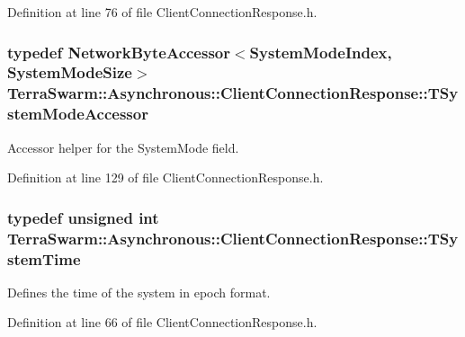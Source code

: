 Definition at line 76 of file Client\-Connection\-Response.\-h.

\hypertarget{class_terra_swarm_1_1_asynchronous_1_1_client_connection_response_a248ac200307842dee28bd5b5cfec47da}{
\subsubsection[{T\-System\-Mode\-Accessor}]{\setlength{\rightskip}{0pt plus 5cm}typedef {\bf Network\-Byte\-Accessor}$<${\bf System\-Mode\-Index}, {\bf System\-Mode\-Size}$>$ {\bf Terra\-Swarm\-::\-Asynchronous\-::\-Client\-Connection\-Response\-::\-T\-System\-Mode\-Accessor}\hspace{0.3cm}{\ttfamily [private]}}}\label{class_terra_swarm_1_1_asynchronous_1_1_client_connection_response_a248ac200307842dee28bd5b5cfec47da}


Accessor helper for the System\-Mode field. 



Definition at line 129 of file Client\-Connection\-Response.\-h.

\hypertarget{class_terra_swarm_1_1_asynchronous_1_1_client_connection_response_ac32ae5e652874b024aae5ed2f816c155}{
\subsubsection[{T\-System\-Time}]{\setlength{\rightskip}{0pt plus 5cm}typedef unsigned int {\bf Terra\-Swarm\-::\-Asynchronous\-::\-Client\-Connection\-Response\-::\-T\-System\-Time}}}\label{class_terra_swarm_1_1_asynchronous_1_1_client_connection_response_ac32ae5e652874b024aae5ed2f816c155}


Defines the time of the system in epoch format. 



Definition at line 66 of file Client\-Connection\-Response.\-h.

